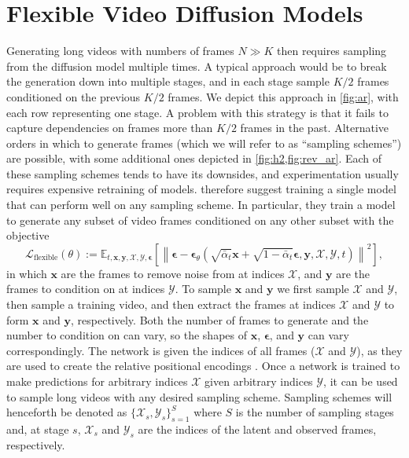 \section{Flexible Video Diffusion Models}
Generating long videos with numbers of frames $N \gg K$ then requires sampling from the diffusion model multiple times. A typical approach would be to break the generation down into multiple stages, and in each stage sample $K/2$ frames conditioned on the previous $K/2$ frames. 
We depict this approach in \cref{fig:ar}, with each row representing one stage. A problem with this strategy is that it fails to capture dependencies on frames more than $K/2$ frames in the past. 
Alternative orders in which to generate frames (which we will refer to as ``sampling schemes'') are possible, with some additional ones depicted in \cref{fig:h2,fig:rev_ar}. Each of these sampling schemes tends to have its downsides, and experimentation usually requires expensive retraining of models. 
\citet{fdm} therefore suggest training a single model that can perform well on any sampling scheme. In particular, they train a model to generate any subset of video frames conditioned on any other subset with the objective
\begin{equation}
    \mathcal{L}_{\text {flexible}}(\theta):=\mathbb{E}_{t, \mathbf{x}, \mathbf{y}, \mathcal{X}, \mathcal{Y}, \boldsymbol{\epsilon}}\left[\left\|\boldsymbol{\epsilon}-\boldsymbol{\epsilon}_\theta\left(\sqrt{\bar{\alpha}_t} \mathbf{x}+\sqrt{1-\bar{\alpha}_t} \boldsymbol{\epsilon}, \mathbf{y}, \mathcal{X}, \mathcal{Y}, t\right)\right\|^2\right],
    \label{eq:lflexible}
\end{equation}
in which $\mathbf{x}$ are the frames to remove noise from at indices $\mathcal{X}$, and $\mathbf{y}$ are the frames to condition on at indices $\mathcal{Y}$. 
To sample $\mathbf{x}$ and $\mathbf{y}$ we first sample $\mathcal{X}$ and $\mathcal{Y}$, then sample a training video, and then extract the frames at indices $\mathcal{X}$ and $\mathcal{Y}$ to form $\mathbf{x}$ and $\mathbf{y}$, respectively.
Both the number of frames to generate and the number to condition on can vary, so the shapes of $\mathbf{x}$, $\boldsymbol{\epsilon}$, and $\mathbf{y}$ can vary correspondingly. The network is given the indices of all frames ($\mathcal{X}$ and $\mathcal{Y}$), as they are used to create the relative positional encodings \citep{rpe1, rpe2}. 
Once a network is trained to make predictions for arbitrary indices $\mathcal{X}$ given arbitrary indices $\mathcal{Y}$, it can be used to sample long videos with any desired sampling scheme. Sampling schemes will henceforth be denoted as $\{\mathcal{X}_s, \mathcal{Y}_s\}_{s=1}^S$ where $S$ is the number of sampling stages and, at stage $s$, $\mathcal{X}_s$ and $\mathcal{Y}_s$ are the indices of the latent and observed frames, respectively. 



